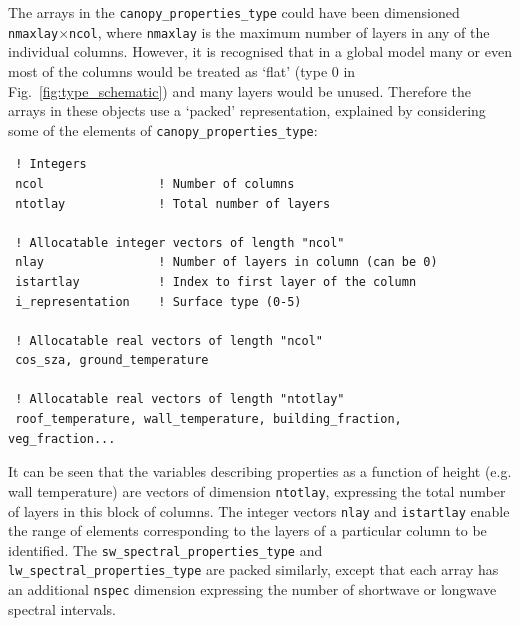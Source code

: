 \documentclass[a4,oneside]{article}
\def\codesize{\small}
\def\code#1{{\codesize\texttt{#1}}}
\begin{document}
The arrays in the \code{canopy\_properties\_type} could have been
dimensioned \code{nmaxlay}$\times$\code{ncol}, where \code{nmaxlay} is
the maximum number of layers in any of the individual columns.
However, it is recognised that in a global model many or even most of
the columns would be treated as `flat' (type 0 in
Fig.\ \ref{fig:type_schematic}) and many layers would be unused.
Therefore the arrays in these objects use a `packed' representation,
explained by considering some of the elements of
\code{canopy\_properties\_type}:
\begin{lstlisting}
 ! Integers
 ncol                ! Number of columns
 ntotlay             ! Total number of layers

 ! Allocatable integer vectors of length "ncol"
 nlay                ! Number of layers in column (can be 0)
 istartlay           ! Index to first layer of the column
 i_representation    ! Surface type (0-5)

 ! Allocatable real vectors of length "ncol"
 cos_sza, ground_temperature

 ! Allocatable real vectors of length "ntotlay"
 roof_temperature, wall_temperature, building_fraction, veg_fraction...
\end{lstlisting}
It can be seen that the variables describing properties as a function
of height (e.g. wall temperature) are vectors of dimension
\code{ntotlay}, expressing the total number of layers in this block of
columns. The integer vectors \code{nlay} and \code{istartlay} enable
the range of elements corresponding to the layers of a particular
column to be identified.  The \code{sw\_spectral\_properties\_type}
and \code{lw\_spectral\_properties\_type} are packed similarly, except
that each array has an additional \code{nspec} dimension expressing
the number of shortwave or longwave spectral intervals.
\end{document}
